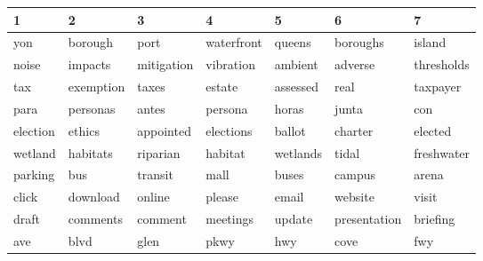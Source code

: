 \begin{table}[ht]
\centering
\begingroup\scriptsize
\begin{tabular}{lllllll}
  \hline
1 & 2 & 3 & 4 & 5 & 6 & 7 \\ 
  \hline
\cellcolor{red!10}yon & \cellcolor{red!10}borough & \cellcolor{red!10}port & \cellcolor{red!10}waterfront & \cellcolor{red!10}queens & \cellcolor{red!10}boroughs & \cellcolor{red!10}island \\ 
  \cellcolor{blue!10}noise & \cellcolor{blue!10}impacts & \cellcolor{blue!10}mitigation & \cellcolor{blue!10}vibration & \cellcolor{blue!10}ambient & \cellcolor{blue!10}adverse & \cellcolor{blue!10}thresholds \\ 
  \cellcolor{red!10}tax & \cellcolor{red!10}exemption & \cellcolor{red!10}taxes & \cellcolor{red!10}estate & \cellcolor{red!10}assessed & \cellcolor{red!10}real & \cellcolor{red!10}taxpayer \\ 
  \cellcolor{red!10}para & \cellcolor{red!10}personas & \cellcolor{red!10}antes & \cellcolor{red!10}persona & \cellcolor{red!10}horas & \cellcolor{red!10}junta & \cellcolor{red!10}con \\ 
  \cellcolor{blue!10}election & \cellcolor{blue!10}ethics & \cellcolor{blue!10}appointed & \cellcolor{blue!10}elections & \cellcolor{blue!10}ballot & \cellcolor{blue!10}charter & \cellcolor{blue!10}elected \\ 
  \cellcolor{red!10}wetland & \cellcolor{red!10}habitats & \cellcolor{red!10}riparian & \cellcolor{red!10}habitat & \cellcolor{red!10}wetlands & \cellcolor{red!10}tidal & \cellcolor{red!10}freshwater \\ 
  \cellcolor{blue!10}parking & \cellcolor{blue!10}bus & \cellcolor{blue!10}transit & \cellcolor{blue!10}mall & \cellcolor{blue!10}buses & \cellcolor{blue!10}campus & \cellcolor{blue!10}arena \\ 
  \cellcolor{red!30}click & \cellcolor{red!30}download & \cellcolor{red!30}online & \cellcolor{red!30}please & \cellcolor{red!30}email & \cellcolor{red!30}website & \cellcolor{red!30}visit \\ 
  \cellcolor{blue!10}draft & \cellcolor{blue!10}comments & \cellcolor{blue!10}comment & \cellcolor{blue!10}meetings & \cellcolor{blue!10}update & \cellcolor{blue!10}presentation & \cellcolor{blue!10}briefing \\ 
  \cellcolor{blue!10}ave & \cellcolor{blue!10}blvd & \cellcolor{blue!10}glen & \cellcolor{blue!10}pkwy & \cellcolor{blue!10}hwy & \cellcolor{blue!10}cove & \cellcolor{blue!10}fwy \\ 

\end{tabular}
\end{table}
